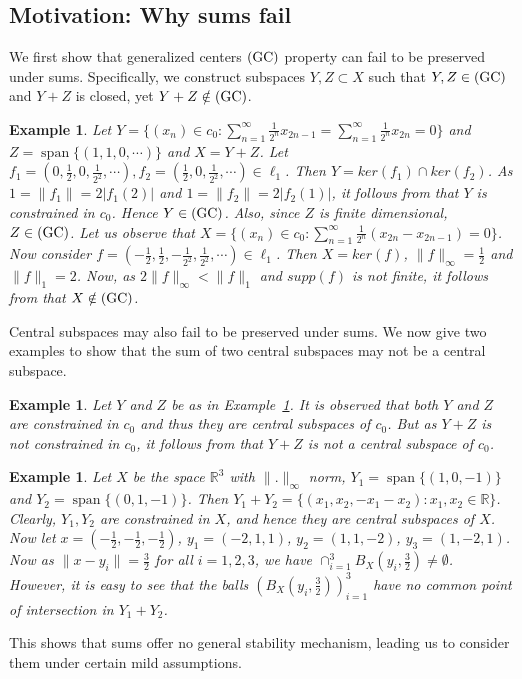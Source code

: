 \documentclass[11pt]{amsart}
\newtheorem{ex}[thm]{Example}
\newcommand{\es}{\emptyset}
\newcommand{\mb}{\mathbb}
\newcommand{\iy}{\infty}
\newcounter{cnt1}
\newcounter{cnt2}
\newcounter{cnt3}
\newcounter{cnt4}
\newcommand{\bla}{\begin{list}{$(\alph{cnt2})$} {\usecounter{cnt2}
\setlength{\topsep}{0pt} \setlength{\itemsep}{0pt}}}
\newcommand{\el}{\end{list}}
\DeclareMathOperator{\spn}{span}
\newcommand{\GC}{{\mbox{\rm (GC)}}}
\begin{document}
\subsection{Motivation: Why sums fail}

We first show that generalized centers $\GC$ property can fail to be preserved under sums.
Specifically, we construct subspaces $Y,Z\subset X$ such that $Y,Z\in\GC$ and $Y+Z$ is closed,
yet $Y+Z\notin\GC$. 
\begin{ex}\label{E2}
Let $Y=\{(x_n)\in c_0:\sum_{n=1}^\iy\frac{1}{2^n}x_{2n-1}=\sum_{n=1}^\iy\frac{1}{2^n}x_{2n}=0\}$ and $Z=\spn\{(1,1,0,\cdots)\}$ and $X=Y+Z$. Let $f_1=(0,\frac{1}{2},0,\frac{1}{2^2},\cdots), f_2=(\frac{1}{2},0,\frac{1}{2^2},\cdots)\in\ell_1$. Then $Y=ker(f_1)\cap ker(f_2)$. As $1=\|f_1\|=2|f_1(2)|$ and $1=\|f_2\|=2|f_2(1)|$, it follows from \cite[Theorem~6.3]{BP} that $Y$ is constrained in $c_0$. Hence $Y\in \GC$.  Also, since $Z$ is finite dimensional, $Z\in\GC$. Let us observe that $X=\{(x_n)\in c_0:\sum_{n=1}^\iy\frac{1}{2^n}(x_{2n}-x_{2n-1})=0\}$. Now consider $f=(-\frac{1}{2},\frac{1}{2},-\frac{1}{2^2},\frac{1}{2^2},\cdots)\in \ell_1$. Then $X=ker(f)$, $\|f\|_\iy=\frac{1}{2}$ and $\|f\|_1=2$. Now, as $2\|f\|_\iy<\|f\|_1$ and $supp(f)$ is not finite, it follows  from \cite[Theorem~2]{LV1} that $X\notin \GC$. 
\end{ex}

Central subspaces may also fail to be preserved under sums.
We now give two examples to show that the sum of two central subspaces may not be a central subspace.
\begin{ex}

Let $Y$ and $Z$ be as in Example~\ref{E2}. It is observed that both $Y$ and $Z$ are constrained in $c_0$  and thus they are central subspaces of $c_0$. But as $Y+Z$ is not constrained in $c_0$, it follows from \cite[Proposition~13]{Rao1} that $Y+Z$ is not a central subspace of $c_0$.
\end{ex}
\begin{ex}
Let $X$ be the space $\mb{R}^3$ with $\|.\|_\iy$ norm, $Y_1=\spn\{(1,0,-1)\}$ and $Y_2=\spn\{(0,1,-1)\}$. Then $Y_1+Y_2=\{(x_1,x_2,-x_1-x_2):x_1,x_2\in\mb{R}\}$. Clearly, $Y_1,Y_2$ are constrained in $X$, and hence they are central subspaces of $X$. Now let $x=(-\frac{1}{2},-\frac{1}{2},-\frac{1}{2})$, $y_1=(-2,1,1)$, $y_2=(1,1,-2)$, $y_3=(1,-2,1)$. Now as $\|x-y_i\|=\frac{3}{2}$ for all $i=1,2,3$, we have $\cap_{i=1}^3B_X(y_i,\frac{3}{2})\neq\es$. However, it is easy to see that the balls $(B_X(y_i,\frac{3}{2}))_{i=1}^3$ have no common point of intersection in $Y_1+Y_2$.
\end{ex}
This shows that sums offer no general stability mechanism, leading us to consider them under certain mild assumptions.
\end{document}
